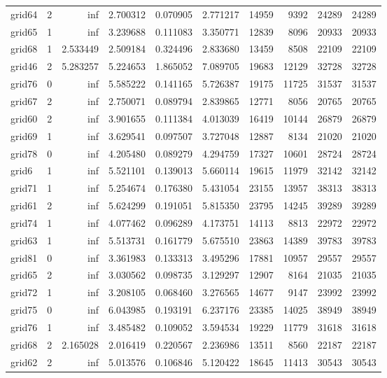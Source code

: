 \begin{longtable}{|l|r|r|r|r|r|r|r|r|r|}
grid64 & 2 & inf & 2.700312 & 0.070905 & 2.771217 & 14959 & 9392 & 24289 & 24289 \\
grid65 & 1 & inf & 3.239688 & 0.111083 & 3.350771 & 12839 & 8096 & 20933 & 20933 \\
grid68 & 1 & 2.533449 & 2.509184 & 0.324496 & 2.833680 & 13459 & 8508 & 22109 & 22109 \\
grid46 & 2 & 5.283257 & 5.224653 & 1.865052 & 7.089705 & 19683 & 12129 & 32728 & 32728 \\
grid76 & 0 & inf & 5.585222 & 0.141165 & 5.726387 & 19175 & 11725 & 31537 & 31537 \\
grid67 & 2 & inf & 2.750071 & 0.089794 & 2.839865 & 12771 & 8056 & 20765 & 20765 \\
grid60 & 2 & inf & 3.901655 & 0.111384 & 4.013039 & 16419 & 10144 & 26879 & 26879 \\
grid69 & 1 & inf & 3.629541 & 0.097507 & 3.727048 & 12887 & 8134 & 21020 & 21020 \\
grid78 & 0 & inf & 4.205480 & 0.089279 & 4.294759 & 17327 & 10601 & 28724 & 28724 \\
grid6 & 1 & inf & 5.521101 & 0.139013 & 5.660114 & 19615 & 11979 & 32142 & 32142 \\
grid71 & 1 & inf & 5.254674 & 0.176380 & 5.431054 & 23155 & 13957 & 38313 & 38313 \\
grid61 & 2 & inf & 5.624299 & 0.191051 & 5.815350 & 23795 & 14245 & 39289 & 39289 \\
grid74 & 1 & inf & 4.077462 & 0.096289 & 4.173751 & 14113 & 8813 & 22972 & 22972 \\
grid63 & 1 & inf & 5.513731 & 0.161779 & 5.675510 & 23863 & 14389 & 39783 & 39783 \\
grid81 & 0 & inf & 3.361983 & 0.133313 & 3.495296 & 17881 & 10957 & 29557 & 29557 \\
grid65 & 2 & inf & 3.030562 & 0.098735 & 3.129297 & 12907 & 8164 & 21035 & 21035 \\
grid72 & 1 & inf & 3.208105 & 0.068460 & 3.276565 & 14677 & 9147 & 23992 & 23992 \\
grid75 & 0 & inf & 6.043985 & 0.193191 & 6.237176 & 23385 & 14025 & 38949 & 38949 \\
grid76 & 1 & inf & 3.485482 & 0.109052 & 3.594534 & 19229 & 11779 & 31618 & 31618 \\
grid68 & 2 & 2.165028 & 2.016419 & 0.220567 & 2.236986 & 13511 & 8560 & 22187 & 22187 \\
grid62 & 2 & inf & 5.013576 & 0.106846 & 5.120422 & 18645 & 11413 & 30543 & 30543 \\

\end{longtable}
